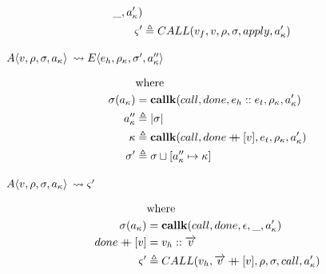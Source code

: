\documentclass[12pt,draft]{article}
\newcommand\mdoubleplus{\ensuremath{\mathbin{+\mkern-9mu+}}}
\newcommand{\E}[4]{E\langle #1 , #2 , #3 , #4 \rangle}
\newcommand{\A}[4]{A\langle #1 , #2 , #3 , #4 \rangle}
\begin{document}
\begin{multicols*}{2}
\begin{align*}
                       \_ , a_{\kappa}') \\
    \varsigma' &\triangleq CALL(v_f , v , \rho , \sigma , apply , a_{\kappa}')
  \end{align*}
  \begin{center}
    $\A{v}{\cenv}{\cstore}{\ckaddr}$
    $\leadsto \E{e_h}{\cenv_{\kappa}}{\cstore'}{\ckaddr''}$
  \end{center}
  \vspace{-7mm}
  \begin{align*}
    &\text{where} \\
    \cstore(\ckaddr) &= \textbf{callk}(call, done , e_h::e_t ,
                       \cenv_{\ckont} , \ckaddr') \\
    \ckaddr'' &\triangleq |\cstore| \\
    \ckont &\triangleq \textbf{callk}(call, done \mdoubleplus [v] ,
             e_t , \cenv_{\ckont} , \ckaddr') \\
    \cstore' &\triangleq \cstore \sqcup [\ckaddr'' \mapsto \ckont]
  \end{align*}
  \begin{center}
    $\A{v}{\cenv}{\cstore}{\ckaddr}$
    $\leadsto \varsigma' $
  \end{center}
  \vspace{-7mm}
  \begin{align*}
    &\text{where} \\
    \cstore(\ckaddr) &= \textbf{callk}(call, done ,
                       \epsilon , \_ , \ckaddr') \\
    done \mdoubleplus [v] &= v_h :: \overrightarrow{v} \\
    \cstate' &\triangleq CALL(v_h , \overrightarrow{v} \mdoubleplus [v] ,
               \cenv , \cstore , call , \ckaddr') \\
  \end{align*}
\end{multicols*}

\end{document}
